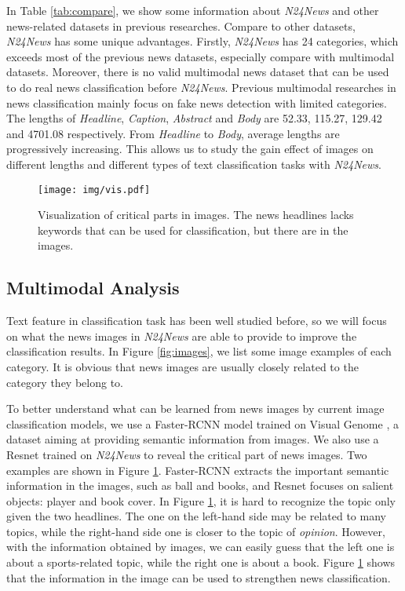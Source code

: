 \documentclass[10pt, a4paper]{article}
\begin{document}
In Table \ref{tab:compare}, we show some information about \textit{N24News} and other news-related datasets in previous researches. Compare to other datasets, \textit{N24News} has some unique advantages. 
Firstly, \textit{N24News} has 24 categories, which exceeds most of the previous news datasets, especially compare with multimodal datasets.
Moreover, there is no valid multimodal news dataset that can be used to do real news classification before \textit{N24News}. Previous multimodal researches in news classification mainly focus on fake news detection with limited categories.
The lengths of \textit{Headline}, \textit{Caption}, \textit{Abstract} and \textit{Body} are 52.33, 115.27, 129.42 and 4701.08 respectively. From \textit{Headline} to \textit{Body}, average lengths are progressively increasing.
This allows us to study the gain effect of images on different lengths and different types of text classification tasks with \textit{N24News}.

\begin{figure}[]
    \centering
    \texttt{[image: img/vis.pdf]}
    \caption{Visualization of critical parts in images. The news headlines lacks keywords that can be used for classification, but there are in the images.}
    \label{fig:vg}
\end{figure}


\subsection{Multimodal Analysis}

Text feature in classification task has been well studied before, so we will focus on what the news images in \textit{N24News} are able to provide to improve the classification results.
In Figure \ref{fig:images}, we list some image examples of each category. It is obvious that news images are usually closely related to the category they belong to. 

To better understand what can be learned from news images by current image classification models, we use a Faster-RCNN \cite{fasterrcnn} model trained on Visual Genome \cite{krishnavisualgenome}, a dataset aiming at providing semantic information from images.
We also use a Resnet\cite{resnet} trained on \textit{N24News} to reveal the critical part of news images. 
Two examples are shown in Figure \ref{fig:vg}. Faster-RCNN extracts the important semantic information in the images, such as ball and books, and Resnet focuses on salient objects: player and book cover. 
In Figure \ref{fig:vg}, it is hard to recognize the topic only given the two headlines.
The one on the left-hand side may be related to many topics, while the right-hand side one is closer to the topic of \textit{opinion}. However, with the information obtained by images, we can easily guess that the left one is about a sports-related topic, while the right one is about a book. Figure \ref{fig:vg} shows that the information in the image can be used to strengthen news classification.
\end{document}
